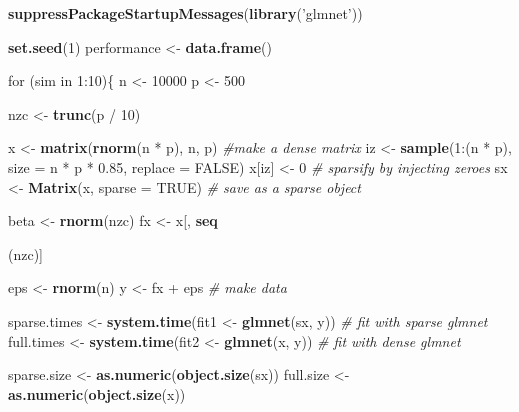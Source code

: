 \documentclass[]{book}
\newenvironment{Shaded}{\begin{snugshade}}{\end{snugshade}}
\newcommand{\KeywordTok}[1]{\textcolor[rgb]{0.13,0.29,0.53}{\textbf{{#1}}}}
\newcommand{\DataTypeTok}[1]{\textcolor[rgb]{0.13,0.29,0.53}{{#1}}}
\newcommand{\DecValTok}[1]{\textcolor[rgb]{0.00,0.00,0.81}{{#1}}}
\newcommand{\FloatTok}[1]{\textcolor[rgb]{0.00,0.00,0.81}{{#1}}}
\newcommand{\StringTok}[1]{\textcolor[rgb]{0.31,0.60,0.02}{{#1}}}
\newcommand{\CommentTok}[1]{\textcolor[rgb]{0.56,0.35,0.01}{\textit{{#1}}}}
\newcommand{\OtherTok}[1]{\textcolor[rgb]{0.56,0.35,0.01}{{#1}}}
\newcommand{\NormalTok}[1]{{#1}}
\theoremstyle{definition}
\theoremstyle{definition}
\theoremstyle{remark}
\begin{document}
\begin{Shaded}
\begin{Highlighting}[]
\KeywordTok{suppressPackageStartupMessages}\NormalTok{(}\KeywordTok{library}\NormalTok{(}\StringTok{'glmnet'}\NormalTok{))}

\KeywordTok{set.seed}\NormalTok{(}\DecValTok{1}\NormalTok{)}
\NormalTok{performance <-}\StringTok{ }\KeywordTok{data.frame}\NormalTok{()}
 
\NormalTok{for (sim in }\DecValTok{1}\NormalTok{:}\DecValTok{10}\NormalTok{)\{}
  \NormalTok{n <-}\StringTok{ }\DecValTok{10000}
  \NormalTok{p <-}\StringTok{ }\DecValTok{500}
 
  \NormalTok{nzc <-}\StringTok{ }\KeywordTok{trunc}\NormalTok{(p /}\StringTok{ }\DecValTok{10}\NormalTok{)}
 
  \NormalTok{x <-}\StringTok{ }\KeywordTok{matrix}\NormalTok{(}\KeywordTok{rnorm}\NormalTok{(n *}\StringTok{ }\NormalTok{p), n, p) }\CommentTok{#make a dense matrix}
  \NormalTok{iz <-}\StringTok{ }\KeywordTok{sample}\NormalTok{(}\DecValTok{1}\NormalTok{:(n *}\StringTok{ }\NormalTok{p),}
               \DataTypeTok{size =} \NormalTok{n *}\StringTok{ }\NormalTok{p *}\StringTok{ }\FloatTok{0.85}\NormalTok{,}
               \DataTypeTok{replace =} \OtherTok{FALSE}\NormalTok{)}
  \NormalTok{x[iz] <-}\StringTok{ }\DecValTok{0} \CommentTok{# sparsify by injecting zeroes}
  \NormalTok{sx <-}\StringTok{ }\KeywordTok{Matrix}\NormalTok{(x, }\DataTypeTok{sparse =} \OtherTok{TRUE}\NormalTok{) }\CommentTok{# save as a sparse object}
 
  \NormalTok{beta <-}\StringTok{ }\KeywordTok{rnorm}\NormalTok{(nzc)}
  \NormalTok{fx <-}\StringTok{ }\NormalTok{x[, }\KeywordTok{seq}\NormalTok{(nzc)] %
 
  \NormalTok{eps <-}\StringTok{ }\KeywordTok{rnorm}\NormalTok{(n)}
  \NormalTok{y <-}\StringTok{ }\NormalTok{fx +}\StringTok{ }\NormalTok{eps }\CommentTok{# make data}
 
  \NormalTok{sparse.times <-}\StringTok{ }\KeywordTok{system.time}\NormalTok{(fit1 <-}\StringTok{ }\KeywordTok{glmnet}\NormalTok{(sx, y)) }\CommentTok{# fit with sparse glmnet}
  \NormalTok{full.times <-}\StringTok{ }\KeywordTok{system.time}\NormalTok{(fit2 <-}\StringTok{ }\KeywordTok{glmnet}\NormalTok{(x, y)) }\CommentTok{# fit with dense glmnet}
  
  \NormalTok{sparse.size <-}\StringTok{ }\KeywordTok{as.numeric}\NormalTok{(}\KeywordTok{object.size}\NormalTok{(sx))}
  \NormalTok{full.size <-}\StringTok{ }\KeywordTok{as.numeric}\NormalTok{(}\KeywordTok{object.size}\NormalTok{(x))}
 
}
\end{Highlighting}
\end{Shaded}
\end{document}
